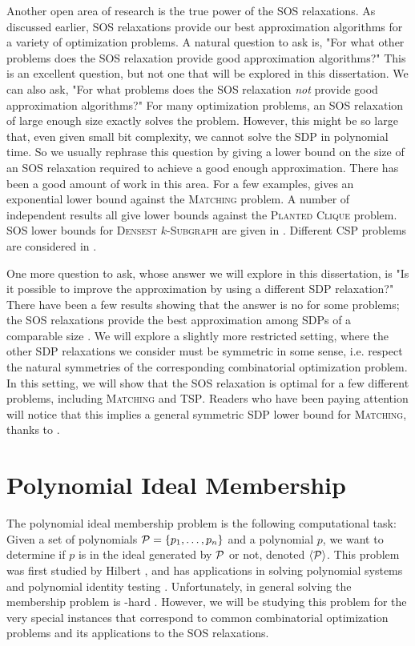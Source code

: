 Another open area of research is the true power of the SOS relaxations.
As discussed earlier, SOS relaxations provide our best approximation algorithms for a variety of optimization problems. 
A natural question to ask is, "For what other problems does the SOS relaxation provide good approximation algorithms?"
This is an excellent question, but not one that will be explored in this dissertation.
We can also ask, "For what problems does the SOS relaxation \emph{not} provide good approximation algorithms?"
For many optimization problems, an SOS relaxation of large enough size exactly solves the problem. 
However, this might be so large that, even given small bit complexity, we cannot solve the SDP in polynomial time. 
So we usually rephrase this question by giving a lower bound on the size of an SOS relaxation required to achieve a good enough approximation. 
There has been a good amount of work in this area. For a few examples, \cite{Gri01} gives an exponential lower bound against the \textsc{Matching} problem. A number of independent results \cite{RS15,MPW15,BHKKMP16} all give lower bounds against the \textsc{Planted Clique} problem. SOS lower bounds for \textsc{Densest $k$-Subgraph} are given in \cite{BCVGZ12}. Different \textsc{CSP} problems are considered in \cite{GMT09,Tul09,Sch08,LRS15}.

One more question to ask, whose answer we will explore in this dissertation, is "Is it possible to improve the approximation by using a different SDP relaxation?"
There have been a few results showing that the answer is no for some problems; the SOS relaxations provide the best approximation among SDPs of a comparable size \cite{LRST14,LRS15}. We will explore a slightly more restricted setting, where the other SDP relaxations we consider must be symmetric in some sense, i.e. respect the natural symmetries of the corresponding combinatorial optimization problem. In this setting, we will show that the SOS relaxation is optimal for a few different problems, including \textsc{Matching} and \textsc{TSP}. Readers who have been paying attention will notice that this implies a general symmetric SDP lower bound for \textsc{Matching}, thanks to \cite{Gri01}. 

\section{Polynomial Ideal Membership}

The polynomial ideal membership problem is the following computational task:
Given a set of polynomials $\mathcal P = \{p_1,\dots,p_n\}$ and a polynomial $p$, we want to determine if $p$ is in the ideal generated by $\mathcal P$ or not, denoted $\langle \mathcal P \rangle$. 
This problem was first studied by Hilbert \cite{Hilbert1893}, and has applications in solving polynomial systems \cite{CLO07} and polynomial identity testing \cite{AM10}.
Unfortunately, in general solving the membership problem is \expspace-hard \cite{Huynh1985}. 
However, we will be studying this problem for the very special instances that correspond to common combinatorial optimization problems and its applications to the SOS relaxations. 

